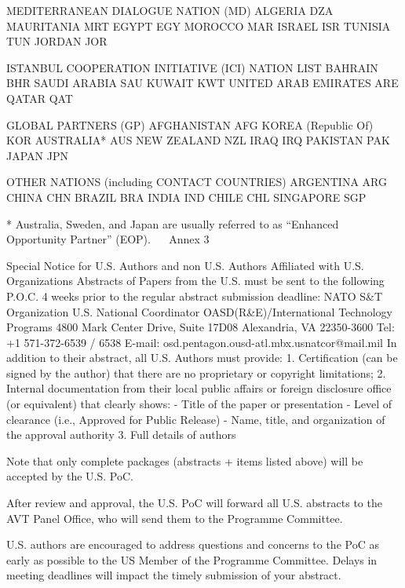 MEDITERRANEAN DIALOGUE NATION (MD)
ALGERIA	DZA	MAURITANIA	MRT
EGYPT	EGY	MOROCCO	MAR
ISRAEL	ISR	TUNISIA	TUN
JORDAN	JOR		

ISTANBUL COOPERATION INITIATIVE (ICI) NATION LIST
BAHRAIN	BHR	SAUDI ARABIA	SAU
KUWAIT	KWT	UNITED ARAB EMIRATES	ARE
QATAR	QAT		

GLOBAL PARTNERS (GP)
AFGHANISTAN	AFG	KOREA (Republic Of)	KOR
AUSTRALIA*	AUS	NEW ZEALAND	NZL
IRAQ	IRQ	PAKISTAN	PAK
JAPAN	JPN		

OTHER NATIONS (including CONTACT COUNTRIES)
ARGENTINA	ARG	CHINA	CHN
BRAZIL	BRA	INDIA	IND
CHILE	CHL	SINGAPORE	SGP


* Australia, Sweden, and Japan are usually referred to as “Enhanced Opportunity Partner” (EOP).
 
Annex 3

Special Notice for U.S. Authors
and non U.S. Authors Affiliated with U.S. Organizations
Abstracts of Papers from the U.S. must be sent to the following P.O.C.
 4 weeks prior to the regular abstract submission deadline:
NATO S&T Organization U.S. National Coordinator
OASD(R&E)/International Technology Programs
4800 Mark Center Drive, Suite 17D08
Alexandria, VA 22350-3600
Tel: +1 571-372-6539 / 6538
E-mail: osd.pentagon.ousd-atl.mbx.usnatcor@mail.mil
In addition to their abstract, all U.S. Authors must provide: 
1. Certification (can be signed by the author) that there are no proprietary or copyright limitations; 
2. Internal documentation from their local public affairs or foreign disclosure office (or equivalent) that clearly shows:
- Title of the paper or presentation 
- Level of clearance (i.e., Approved for Public Release) 
- Name, title, and organization of the approval authority 
3. Full details of authors 

Note that only complete packages (abstracts + items listed above) will be accepted by the U.S. PoC.

After review and approval, the U.S. PoC will forward all U.S. abstracts to the AVT Panel Office, who will send them to the Programme Committee. 

U.S. authors are encouraged to address questions and concerns to the PoC as early as possible to the US Member of the Programme Committee. Delays in meeting deadlines will impact the timely submission of your abstract.


